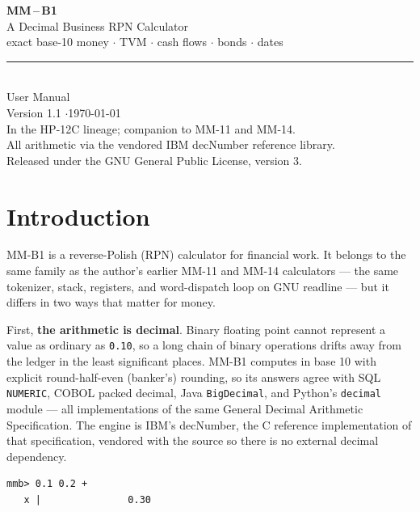 \documentclass[11pt]{article}
\newcommand{\w}[1]{\texttt{#1}}
\begin{document}
\begin{titlepage}
\centering
\vspace*{3.5cm}
{\fontsize{64}{64}\selectfont\bfseries MM\,--\,B1}\\[10pt]
{\Large A Decimal Business RPN Calculator}\\[6pt]
{\large exact base-10 money $\cdot$ TVM $\cdot$ cash flows $\cdot$ bonds $\cdot$ dates}\\[28pt]
\rule{0.55\textwidth}{0.4pt}\\[10pt]
{\large User Manual}\\[4pt]
{Version 1.1 \quad$\cdot$\quad \today}\\
\vfill
{\small In the HP-12C lineage; companion to MM-11 and MM-14.\\
All arithmetic via the vendored IBM decNumber reference library. \\
Released under the GNU General Public License, version 3.}
\end{titlepage}

\tableofcontents
\newpage

\section{Introduction}

MM-B1 is a reverse-Polish (RPN) calculator for financial work. It belongs to
the same family as the author's earlier MM-11 and MM-14 calculators --- the
same tokenizer, stack, registers, and word-dispatch loop on GNU readline ---
but it differs in two ways that matter for money.

First, \textbf{the arithmetic is decimal}. Binary floating point cannot
represent a value as ordinary as \w{0.10}, so a long chain of binary operations
drifts away from the ledger in the least significant places. MM-B1 computes in
base 10 with explicit round-half-even (banker's) rounding, so its answers agree
with SQL \w{NUMERIC}, COBOL packed decimal, Java \w{BigDecimal}, and Python's
\w{decimal} module --- all implementations of the same General Decimal
Arithmetic Specification. The engine is IBM's decNumber, the C reference
implementation of that specification, vendored with the source so there is no
external decimal dependency.

\begin{lstlisting}
mmb> 0.1 0.2 +
   x |               0.30
\end{lstlisting}
\end{document}

